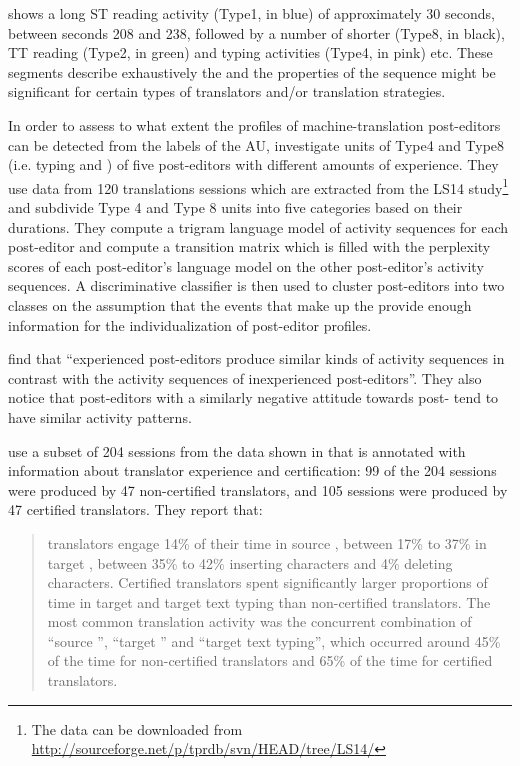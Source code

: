 \documentclass[output=paper]{LSP/langsci}
\begin{document}
 shows a long ST reading activity (Type1, in blue) of approximately 30 seconds, between seconds 208 and 238, followed by a number of shorter  (Type8, in black), TT reading (Type2, in green) and typing activities (Type4, in pink) etc. These segments describe exhaustively the  and the properties of the sequence might be significant for certain types of translators and/or translation strategies.

In order to assess to what extent the profiles of machine-translation post-editors can be detected from the labels of the AU, \citet{Singla2014} investigate units of Type4 and Type8 (i.e. typing and ) of five post-editors with different amounts of experience. They use data from 120 translations sessions which are extracted from the LS14 study\footnote{The data can be downloaded from \url{http://sourceforge.net/p/tprdb/svn/HEAD/tree/LS14/}} and subdivide Type 4 and Type 8 units into five categories based on their durations. They compute a trigram language model of activity sequences for each post-editor and compute a transition matrix which is filled with the perplexity scores of each post-editor's language model on the other post-editor's activity sequences. A discriminative classifier is then used to cluster post-editors into two classes on the assumption that the events that make up the  provide enough information for the individualization of post-editor profiles.

\citet[56]{Singla2014} find that ``experienced post-editors produce similar kinds of activity sequences in contrast with the activity sequences of inexperienced post-editors''. They also notice that post-editors with a similarly negative attitude towards post- tend to have similar activity patterns.

\citet{MartinezGomez2014Characterization} use a subset of 204 sessions from the data shown in  that is annotated with information about translator experience and certification: 99 of the 204 sessions were produced by 47 non-certified translators, and 105 sessions were produced by 47 certified translators. They report that:

\begin{quote}
translators engage 14\% of their time in source , between 17\% to 37\% in target , between 35\% to 42\% inserting characters and 4\% deleting characters. Certified translators spent significantly larger proportions of time in target  and target text typing than non-certified translators. The most common translation activity was the concurrent combination of ``source '', ``target '' and ``target text typing'', which occurred around 45\% of the time for non-certified translators and 65\% of the time for certified translators. \citep[n.p.]{MartinezGomez2014Characterization}
\end{quote}
\end{document}

